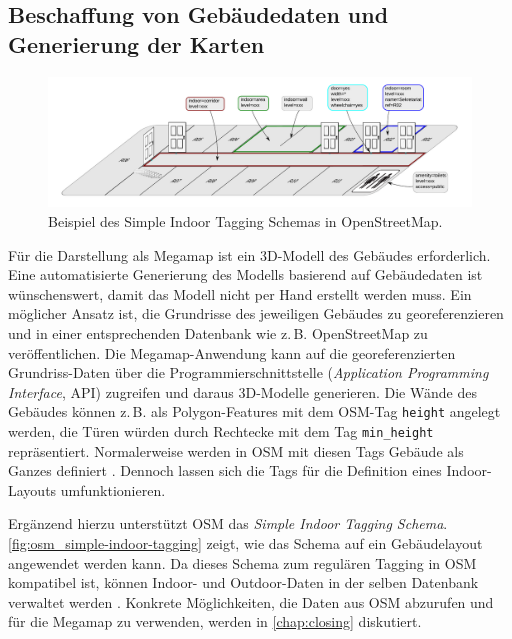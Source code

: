 \subsection{Beschaffung von Gebäudedaten und Generierung der Karten}
\begin{figure}[h]
    \centering
    \includegraphics[trim={17cm, 1cm, 1cm, 0.7cm}, clip, width=0.85\linewidth]{figures/concept/osm_Indoor2_0_elements}
    \caption{Beispiel des Simple Indoor Tagging Schemas in OpenStreetMap. %
        }
    \label{fig:osm_simple-indoor-tagging}
\end{figure}
Für die Darstellung als Megamap ist ein 3D-Modell des Gebäudes erforderlich.
Eine automatisierte Generierung des Modells basierend auf Gebäudedaten ist wünschenswert, damit das Modell nicht per Hand erstellt werden muss.
Ein möglicher Ansatz ist, die Grundrisse des jeweiligen Gebäudes zu georeferenzieren und in einer entsprechenden Datenbank wie z.\,B. OpenStreetMap zu veröffentlichen.
Die Megamap-Anwendung kann auf die georeferenzierten Grundriss-Daten über die Programmierschnittstelle (\emph{Application Programming Interface}, API) zugreifen und daraus 3D-Modelle generieren.
Die Wände des Gebäudes können z.\,B. als Polygon-Features mit dem OSM-Tag \lstinline{height} angelegt werden, die Türen würden durch Rechtecke mit dem Tag \lstinline{min_height} repräsentiert.
Normalerweise werden in OSM mit diesen Tags Gebäude als Ganzes definiert \parencite{OpenStreetMapFoundation2018b}.
Dennoch lassen sich die Tags für die Definition eines Indoor-Layouts umfunktionieren.

Ergänzend hierzu unterstützt OSM das \emph{Simple Indoor Tagging Schema}.
\autoref{fig:osm_simple-indoor-tagging} zeigt, wie das Schema auf ein Gebäudelayout angewendet werden kann.
Da dieses Schema zum regulären Tagging in OSM kompatibel ist, können Indoor- und Outdoor-Daten in der selben Datenbank verwaltet werden \parencite{OpenStreetMapFoundation2018c}.
Konkrete Möglichkeiten, die Daten aus OSM abzurufen und für die Megamap zu verwenden, werden in \autoref{chap:closing} diskutiert.

%
\cleardoublepage
